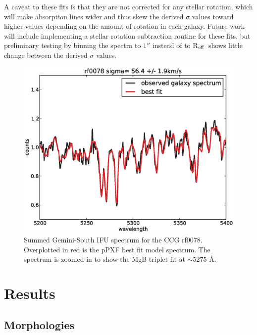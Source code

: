 \documentclass[iop,apj]{emulateapj}
\newcommand{\Reff}{R$_{\rm eff}$}
\begin{document}
A caveat to these fits is that they are not corrected for any stellar rotation, which will make absorption lines wider and thus skew the derived $\sigma$ values toward higher values depending on the amount of rotation in each galaxy. Future work will include implementing a stellar rotation subtraction routine for these fits, but preliminary testing by binning the spectra to $1''$ instead of to \Reff\ shows little change between the derived $\sigma$ values. 

\begin{figure}[hbpt!]
\begin{center}
\includegraphics[scale=0.4]{rf0078ppxffit.eps}
\caption{Summed Gemini-South IFU spectrum for the CCG rf0078. Overplotted in red is the pPXF best fit model spectrum. The spectrum is zoomed-in to show the MgB triplet fit at $\sim 5275$ \AA.}
\label{fig:ppxffit}
\end{center}
\end{figure}

\section{Results}
\label{results}

\subsection{Morphologies}
\label{morph}
\end{document}
